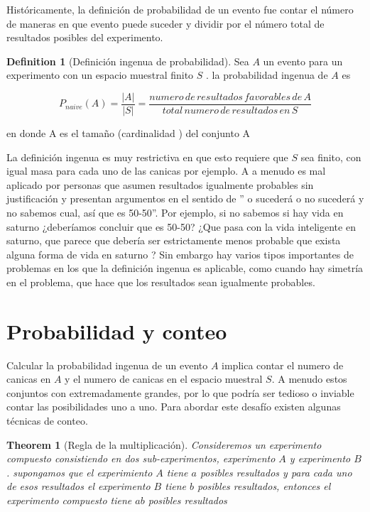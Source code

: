 \documentclass[
]{book}
\newtheorem{theorem}{Theorem}[chapter]
\theoremstyle{definition}
\newtheorem{definition}{Definition}[chapter]
\theoremstyle{definition}
\theoremstyle{definition}
\theoremstyle{definition}
\theoremstyle{remark}
\begin{document}
Históricamente, la definición de probabilidad de un evento fue contar el número de maneras en que evento puede suceder y dividir por el número total de resultados posibles del experimento.

\begin{definition}[Definición ingenua de probabilidad]
\protect\hypertarget{def:definicioningenuaprobabilidad}{}\label{def:definicioningenuaprobabilidad}Sea \(A\) un evento para un experimento con un espacio muestral finito \(S\) . la probabilidad ingenua de \(A\) es

\[P_{naive} (A) = \frac{|A|}{|S|} = \frac { numero\, de\, resultados\, favorables\, de\, A}{total\, numero\, de\, resultados\, en\, S} \]

en donde \textbar A\textbar{} es el tamaño (cardinalidad ) del conjunto A
\end{definition}

La definición ingenua es muy restrictiva en que esto requiere que \(S\) sea finito, con igual masa para cada uno de las canicas por ejemplo. A a menudo es mal aplicado por personas que asumen resultados igualmente probables sin justificación y presentan argumentos en el sentido de '' o sucederá o no sucederá y no sabemos cual, así que es 50-50''. Por ejemplo, si no sabemos si hay vida en saturno ¿deberíamos concluir que es 50-50? ¿Que pasa con la vida inteligente en saturno, que parece que debería ser estrictamente menos probable que exista alguna forma de vida en saturno ? Sin embargo hay varios tipos importantes de problemas en los que la definición ingenua es aplicable, como cuando hay simetría en el problema, que hace que los resultados sean igualmente probables.\citep{blitzstein2019}

\hypertarget{probabilidad-y-conteo}{%
\section{Probabilidad y conteo}\label{probabilidad-y-conteo}}

Calcular la probabilidad ingenua de un evento \(A\) implica contar el numero de canicas en \(A\) y el numero de canicas en el espacio muestral \(S\). A menudo estos conjuntos con extremadamente grandes, por lo que podría ser tedioso o inviable contar las posibilidades uno a uno. Para abordar este desafío existen algunas técnicas de conteo.

\begin{theorem}[Regla de la multiplicación]
\protect\hypertarget{thm:reglamultiplicacion}{}\label{thm:reglamultiplicacion}Consideremos un experimento compuesto consistiendo en dos sub-experimentos, experimento \(A\) y experimento \(B\). supongamos que el experimiento \(A\) tiene \(a\) posibles resultados y para cada uno de esos resultados el experimento \(B\) tiene \(b\) posibles resultados, entonces el experimento compuesto tiene \(ab\) posibles resultados
\end{theorem}
\end{document}
